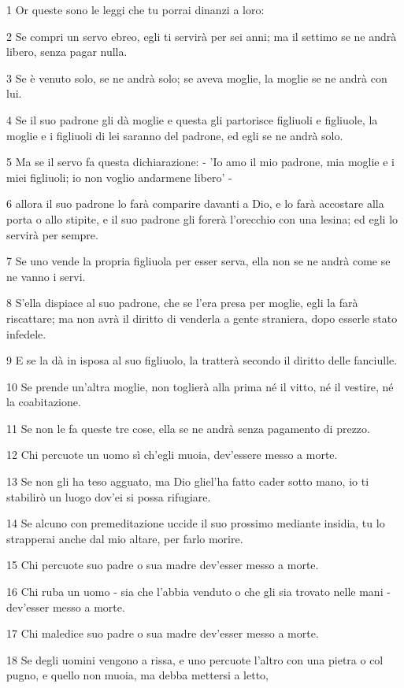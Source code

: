 \par 1 Or queste sono le leggi che tu porrai dinanzi a loro:
\par 2 Se compri un servo ebreo, egli ti servirà per sei anni; ma il settimo se ne andrà libero, senza pagar nulla.
\par 3 Se è venuto solo, se ne andrà solo; se aveva moglie, la moglie se ne andrà con lui.
\par 4 Se il suo padrone gli dà moglie e questa gli partorisce figliuoli e figliuole, la moglie e i figliuoli di lei saranno del padrone, ed egli se ne andrà solo.
\par 5 Ma se il servo fa questa dichiarazione: - 'Io amo il mio padrone, mia moglie e i miei figliuoli; io non voglio andarmene libero' -
\par 6 allora il suo padrone lo farà comparire davanti a Dio, e lo farà accostare alla porta o allo stipite, e il suo padrone gli forerà l'orecchio con una lesina; ed egli lo servirà per sempre.
\par 7 Se uno vende la propria figliuola per esser serva, ella non se ne andrà come se ne vanno i servi.
\par 8 S'ella dispiace al suo padrone, che se l'era presa per moglie, egli la farà riscattare; ma non avrà il diritto di venderla a gente straniera, dopo esserle stato infedele.
\par 9 E se la dà in isposa al suo figliuolo, la tratterà secondo il diritto delle fanciulle.
\par 10 Se prende un'altra moglie, non toglierà alla prima né il vitto, né il vestire, né la coabitazione.
\par 11 Se non le fa queste tre cose, ella se ne andrà senza pagamento di prezzo.
\par 12 Chi percuote un uomo sì ch'egli muoia, dev'essere messo a morte.
\par 13 Se non gli ha teso agguato, ma Dio gliel'ha fatto cader sotto mano, io ti stabilirò un luogo dov'ei si possa rifugiare.
\par 14 Se alcuno con premeditazione uccide il suo prossimo mediante insidia, tu lo strapperai anche dal mio altare, per farlo morire.
\par 15 Chi percuote suo padre o sua madre dev'esser messo a morte.
\par 16 Chi ruba un uomo - sia che l'abbia venduto o che gli sia trovato nelle mani - dev'esser messo a morte.
\par 17 Chi maledice suo padre o sua madre dev'esser messo a morte.
\par 18 Se degli uomini vengono a rissa, e uno percuote l'altro con una pietra o col pugno, e quello non muoia, ma debba mettersi a letto,
